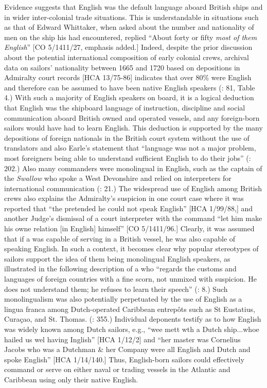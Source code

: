   Evidence suggests that English was the default language aboard British ships and in wider inter-colonial trade situations. This is understandable in situations such as that of Edward Whittaker, when asked about the number and nationality of men on the ship his  had encountered, replied “About forty or fifty \textit{most of them English}” [CO 5/1411/27, emphasis added.] Indeed, despite the prior discussion about the potential international composition of early colonial crews, archival data on sailors’ nationality between 1665 and 1720 based on depositions in Admiralty court records [HCA 13/75-86] indicates that over 80\% were English and therefore can be assumed to have been native English speakers (\citealt{Earle1993}: 81, Table 4.) With such a majority of English speakers on board, it is a logical deduction that English was the shipboard language of instruction, discipline and social communication aboard British owned and operated vessels, and any foreign-born sailors would have had to learn English. This deduction is supported by the many depositions of foreign nationals in the British court system without the use of translators and also Earle’s statement that “language was not a major problem, most foreigners being able to understand sufficient English to do their jobs” (\citeyear*{Earle1998}: 202.) Also many commanders were monolingual in English, such as the captain of the \textit{Swallow} who spoke a West Devonshire  and relied on interpreters for international communication (\citealt{Earle1998}: 21.) The widespread use of English among British crews also explains the Admiralty’s suspicion in one court case where it was reported that “the  pretended he could not speak English” [HCA 1/99/88,] and another Judge’s dismissal of a court interpreter with the command “let him make his owne relation [in English] himself” [CO 5/1411/96.] Clearly, it was assumed that if a  was capable of serving in a British vessel, he was also capable of speaking English.  In such a context, it becomes clear why popular stereotypes of sailors support the idea of them being monolingual English speakers, as illustrated in the following description of a  who “regards the customs and languages of foreign countries with a fine scorn, not unmixed with suspicion. He does not understand them; he refuses to learn their speech” (\citealt{FoxSmith1924}: 8.) Such monolingualism was also potentially perpetuated by the use of English as a lingua franca among Dutch-operated Caribbean entrepôts such as St Eustatius, Curaçao, and St. Thomas. (\citealt{Jarvis2010}: 355.) Individual deponents testify as to how English was widely known among Dutch sailors, e.g., “wee mett wth a Dutch ship...whoe hailed us wel having Inglish” [HCA 1/12/2] and “her master was Cornelius Jacobs who was a Dutchman \& her Company were all English and Dutch and spoke English” [HCA 1/14/140.] Thus, English-born sailors could effectively command or serve on either naval or trading vessels in the Atlantic and Caribbean using only their native English. 

